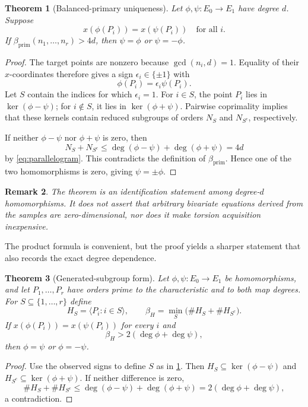 \documentclass[11pt]{article}
\newtheorem{theorem}{Theorem}[section]
\newtheorem{remark}[theorem]{Remark}
\newcommand{\betaP}{\beta_{\mathrm{prim}}}
\begin{document}
\begin{theorem}[Balanced-primary uniqueness]\label{thm:balanced}
Let $\phi,\psi:E_0\to E_1$ have degree $d$.  Suppose
\[
 x(\phi(P_i))=x(\psi(P_i))
 \quad\text{for all }i.
\]
If $\betaP(n_1,\ldots,n_r)>4d$, then $\psi=\phi$ or $\psi=-\phi$.
\end{theorem}

\begin{proof}
The target points are nonzero because $\gcd(n_i,d)=1$.  Equality of their
$x$-coordinates therefore gives a sign $\epsilon_i\in\{\pm1\}$ with
\[
 \phi(P_i)=\epsilon_i\psi(P_i).
\]
Let $S$ contain the indices for which $\epsilon_i=1$.  For $i\in S$, the
point $P_i$ lies in $\ker(\phi-\psi)$; for $i\notin S$, it lies in
$\ker(\phi+\psi)$.  Pairwise coprimality implies that these kernels contain
reduced subgroups of orders $N_S$ and $N_{S^c}$, respectively.

If neither $\phi-\psi$ nor $\phi+\psi$ is zero, then
\[
 N_S+N_{S^c}
 \le \deg(\phi-\psi)+\deg(\phi+\psi)
 =4d
\]
by \cref{eq:parallelogram}.  This contradicts the definition of $\betaP$.
Hence one of the two homomorphisms is zero, giving $\psi=\pm\phi$.
\end{proof}

\begin{remark}
The theorem is an identification statement among degree-$d$ homomorphisms.
It does not assert that arbitrary bivariate equations derived from the samples
are zero-dimensional, nor does it make torsion acquisition inexpensive.
\end{remark}

The product formula is convenient, but the proof yields a sharper statement
that also records the exact degree dependence.

\begin{theorem}[Generated-subgroup form]\label{thm:generated}
Let $\phi,\psi:E_0\to E_1$ be homomorphisms, and let $P_1,\ldots,P_r$
have orders prime to the characteristic and to both map degrees.  For
$S\subseteq\{1,\ldots,r\}$ define
\[
 H_S=\langle P_i:i\in S\rangle,
 \qquad
 \beta_H=\min_S\bigl(\#H_S+\#H_{S^c}\bigr).
\]
If $x(\phi(P_i))=x(\psi(P_i))$ for every $i$ and
\[
 \beta_H>2(\deg\phi+\deg\psi),
\]
then $\phi=\psi$ or $\phi=-\psi$.
\end{theorem}

\begin{proof}
Use the observed signs to define $S$ as in
\cref{thm:balanced}.  Then $H_S\subseteq\ker(\phi-\psi)$ and
$H_{S^c}\subseteq\ker(\phi+\psi)$.  If neither difference is zero,
\[
 \#H_S+\#H_{S^c}
 \le \deg(\phi-\psi)+\deg(\phi+\psi)
 =2(\deg\phi+\deg\psi),
\]
a contradiction.
\end{proof}
\end{document}
